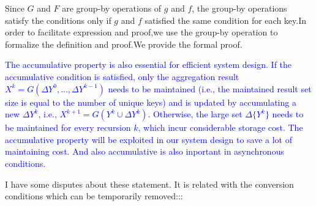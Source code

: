 {	{\color{green}
		Since $G$ and $F$ are group-by operations of $g$ and $f$, the group-by operations satisfy the conditions only if $g$ and $f$ satisfied the same condition for each key.In order to facilitate expression and proof,we use the group-by operation to formalize the definition and proof.We provide the formal proof.}
	

	
	
	
	\textcolor{blue}{
		The accumulative property is also essential for efficient system design. If the accumulative condition is satisfied, only the aggregation result $X^k=G(\Delta Y^{0},\ldots,\Delta Y^{k-1})$ needs to be maintained (i.e., the maintained result set size is equal to the number of unique keys) and is updated by accumulating a new $\Delta Y^{k}$, i.e., $X^{k+1}=G(Y^k \cup \Delta Y^k)$. Otherwise, the large set $\Delta \{Y^{k}\}$ needs to be maintained for every recursion $k$, which incur considerable storage cost. The accumulative property will be exploited in our system design to save a lot of maintaining cost. And also accumulative is also inportant in asynchronous conditions.
	}
	
	{\color{blue}
		I have some disputes about these statement. It is related with the conversion conditions which can be temporarily removed:::	
		
}}
